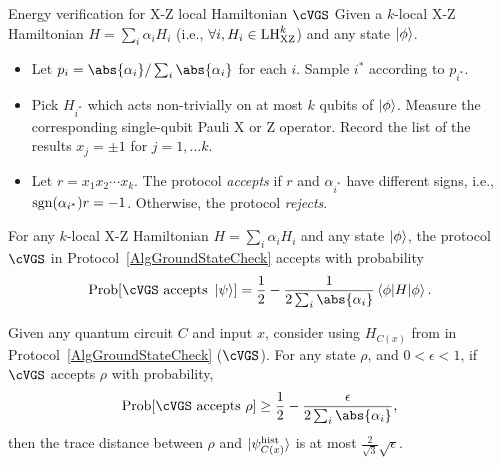 \begin{protocol}{Energy verification for X-Z local Hamiltonian $\cVGS$} \label{AlgGroundStateCheck}
Given a $k$-local X-Z Hamiltonian
$H=\sum_i \alpha_{i} H_i$ (i.e., $\forall i, H_i \in \mathrm{LH}_{\mathrm{XZ}}^{k}$) and any state $\ket{\phi}$.

\begin{itemize}
\item Let $p_i= \abs{\alpha_i}/\sum_i \abs{\alpha_i}$ for each $i$. Sample $i^*$ according to $p_{i^*}$.
\item Pick $H_{i^*}$ which acts non-trivially on at most $k$ qubits of $\ket{\phi}$. Measure the corresponding single-qubit Pauli X or Z operator.
Record the list of the results $x_j=\pm 1$ for $j=1, \ldots k$.
\item Let $r=x_1x_2\cdots x_k$. The protocol \emph{accepts} if $r$ and $\alpha_{i^*}$ have different signs, i.e., $\operatorname{sgn}(\alpha_{i^*})r=-1$. Otherwise, the protocol \emph{rejects}.
\end{itemize}
\end{protocol}

\begin{lem}
    \label{thm:HamCheck}
    For any $k$-local X-Z Hamiltonian $H=\sum_i \alpha_{i} H_i$ and any state $\ket{\phi}$,
    the protocol $\cVGS$ in Protocol~\ref{AlgGroundStateCheck} accepts with
    probability
\begin{equation}
 \mathrm{Prob}[ \cVGS \text{ accepts } \ket{\psi}] = \frac{1}{2} - \frac{1}{2 \sum_i \abs{\alpha_i}}\braket{\phi|H|\phi}.
\end{equation}
\end{lem}

\begin{theorem} \label{thm:HamCheckClose}
Given any quantum circuit $C$ and input $x$, consider using $H_{C(x)}$ from  in Protocol~\ref{AlgGroundStateCheck} ($\cVGS$).
For any state $\rho$, and $0< \epsilon < 1$, if $\cVGS$ accepts $\rho$ with probability,
\[
 \mathrm{Prob}[\cVGS \text{ accepts } \rho] \geq \frac{1}{2} - \frac{\epsilon}{2 \sum_i \abs{\alpha_i}},
\]
then the trace distance between $\rho$ and $\ket{\psi_{C(x)}^{\mathrm{hist}}}$ is at most $\frac{2}{\sqrt{3}}\sqrt{\epsilon}$.
\end{theorem}


